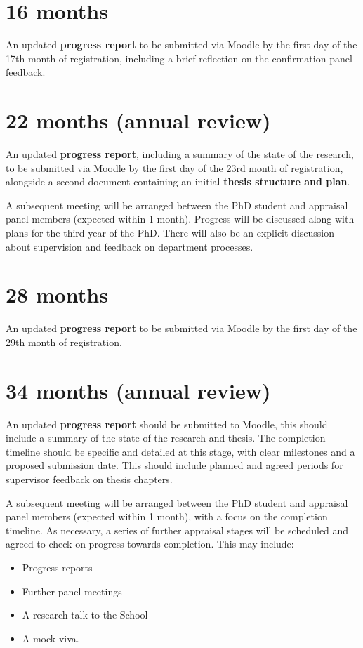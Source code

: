 \documentclass[12pt,a4paper]{article}
\begin{document}
\section{16 months}
An updated \textbf{progress report} to be submitted via Moodle by the first day of the 17th month of registration, including a brief reflection on the confirmation panel feedback.


\section{22 months (annual review)}
An updated \textbf{progress report}, including a summary of the state of the research, to be submitted via Moodle by the first day of the 23rd month of registration, alongside a second document containing an initial \textbf{thesis structure and plan}.

A subsequent meeting will be arranged between the PhD student and appraisal panel members (expected within 1 month). Progress will be discussed along with plans for the third year of the PhD. There will also be an explicit discussion about supervision and feedback on department processes.


\section{28 months}
An updated \textbf{progress report} to be submitted via Moodle by the first day of the 29th month of registration.


\section{34 months (annual review)}
An updated \textbf{progress report} should be submitted to Moodle, this should include a summary of the state of the research and thesis. The completion timeline should be specific and detailed at this stage, with clear milestones and a proposed submission date. This should include planned and agreed periods for supervisor feedback on thesis chapters.

A subsequent meeting will be arranged between the PhD student and appraisal panel members (expected within 1 month), with a focus on the completion timeline. As necessary, a series of further appraisal stages will be scheduled and agreed to check on progress towards completion. This may include:
\begin{itemize}
	\item Progress reports
	\item Further panel meetings
	\item A research talk to the School
	\item A mock viva.
\end{itemize}
\end{document}
